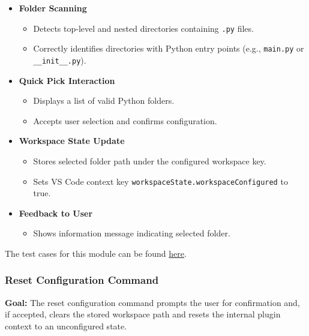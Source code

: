 \documentclass[12pt, titlepage]{article}
\begin{document}
\begin{itemize}
  \item \textbf{Folder Scanning}
    \begin{itemize}
      \item Detects top-level and nested directories containing \texttt{.py} files.
      \item Correctly identifies directories with Python entry points (e.g., \texttt{main.py} or \texttt{\_\_init\_\_.py}).
    \end{itemize}

  \item \textbf{Quick Pick Interaction}
    \begin{itemize}
      \item Displays a list of valid Python folders.
      \item Accepts user selection and confirms configuration.
    \end{itemize}

  \item \textbf{Workspace State Update}
    \begin{itemize}
      \item Stores selected folder path under the configured workspace key.
      \item Sets VS Code context key \texttt{workspaceState.workspaceConfigured} to true.
    \end{itemize}

  \item \textbf{Feedback to User}
    \begin{itemize}
      \item Shows information message indicating selected folder.
    \end{itemize}
\end{itemize}

\noindent The test cases for this module can be found
\href{https://github.com/ssm-lab/capstone--sco-vs-code-plugin/blob/plugin-multi-file/test/commands/configureWorkspace.test.ts}{here}.

\subsubsection{Reset Configuration Command}

\textbf{Goal:} The reset configuration command prompts the user for confirmation and, if accepted, clears the stored workspace path and resets the internal plugin context to an unconfigured state.
\end{document}
